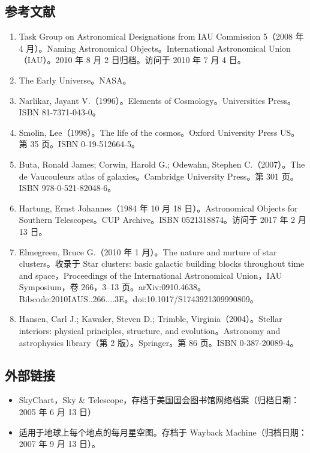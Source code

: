\subsection{参考文献}
\begin{enumerate}
\item Task Group on Astronomical Designations from IAU Commission 5（2008 年 4 月）。Naming Astronomical Objects。International Astronomical Union（IAU）。2010 年 8 月 2 日归档。访问于 2010 年 7 月 4 日。
\item The Early Universe。NASA。
\item Narlikar, Jayant V.（1996）。Elements of Cosmology。Universities Press。ISBN 81-7371-043-0。
\item Smolin, Lee（1998）。The life of the cosmos。Oxford University Press US。第 35 页。ISBN 0-19-512664-5。
\item Buta, Ronald James; Corwin, Harold G.; Odewahn, Stephen C.（2007）。The de Vaucouleurs atlas of galaxies。Cambridge University Press。第 301 页。ISBN 978-0-521-82048-6。
\item Hartung, Ernst Johannes（1984 年 10 月 18 日）。Astronomical Objects for Southern Telescopes。CUP Archive。ISBN 0521318874。访问于 2017 年 2 月 13 日。
\item Elmegreen, Bruce G.（2010 年 1 月）。The nature and nurture of star clusters。收录于 Star clusters: basic galactic building blocks throughout time and space，Proceedings of the International Astronomical Union，IAU Symposium，卷 266，3–13 页。arXiv:0910.4638。Bibcode:2010IAUS..266....3E。doi:10.1017/S1743921309990809。
\item Hansen, Carl J.; Kawaler, Steven D.; Trimble, Virginia（2004）。Stellar interiors: physical principles, structure, and evolution。Astronomy and astrophysics library（第 2 版）。Springer。第 86 页。ISBN 0-387-20089-4。
\end{enumerate}
\subsection{外部链接}
\begin{itemize}
\item SkyChart，Sky & Telescope，存档于美国国会图书馆网络档案（归档日期：2005 年 6 月 13 日）
\item 适用于地球上每个地点的每月星空图。存档于 Wayback Machine（归档日期：2007 年 9 月 13 日）。
\end{itemize}